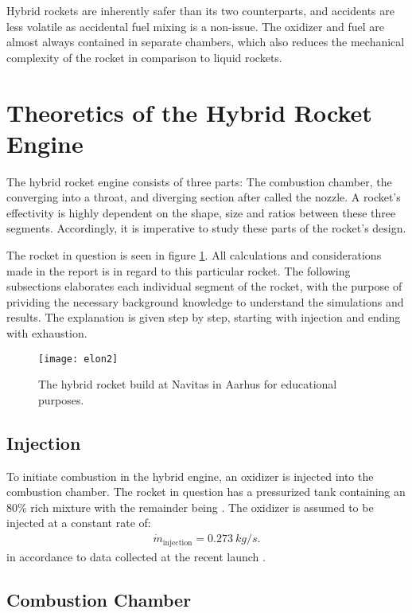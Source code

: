  Hybrid rockets are inherently safer than its two counterparts, and accidents are less volatile as accidental fuel mixing is a non-issue. The oxidizer and fuel are almost always contained in separate chambers, which also reduces the mechanical complexity of the rocket in comparison to liquid rockets.

\section{Theoretics of the Hybrid Rocket Engine}

  The hybrid rocket engine consists of three parts: The combustion chamber, the converging into a throat, and diverging section after called the nozzle. A rocket's effectivity is highly dependent on the shape, size and ratios between these three segments. Accordingly, it is imperative to study these parts of the rocket's design.

  The rocket in question is seen in figure \ref{fig:rocketpic}. All calculations and considerations made in the report is in regard to this particular rocket. The following subsections elaborates each individual segment of the rocket, with the purpose of prividing the necessary background knowledge to understand the simulations and results. The explanation is given step by step, starting with injection and ending with exhaustion.

  \begin{figure}
  \texttt{[image: elon2]}
  \caption{The hybrid rocket build at Navitas in Aarhus for educational purposes.}
  \label{fig:rocketpic}
  \end{figure}
\subsection{Injection}

	To initiate combustion in the hybrid engine, an oxidizer is injected into the combustion chamber. The rocket in question has a pressurized tank containing an $80 \%$  rich mixture with the remainder being . The oxidizer is assumed to be injected at a constant rate of:
		\begin{align}
			\dot{m}_\text{injection} = \SI{0.273}{kg/s}.
		\end{align}
	in accordance to data collected at the recent launch .


\subsection{Combustion Chamber}


